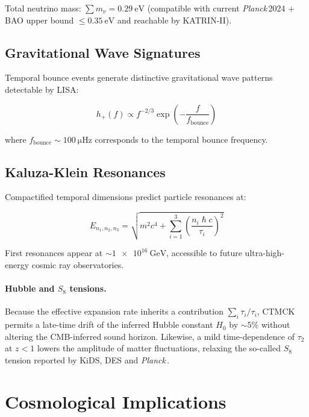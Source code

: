 \documentclass[reprint,amsmath,amssymb,aps,prd,nofootinbib]{revtex4-2}
\begin{document}
Total neutrino mass: $\sum m_\nu = \SI{0.29}{\electronvolt}$  
(compatible with current \textit{Planck}\,2024 + BAO upper bound $\le\SI{0.35}{\electronvolt}$ and reachable by KATRIN-II).

\subsection{Gravitational Wave Signatures}

Temporal bounce events generate distinctive gravitational wave patterns detectable by LISA:

\begin{equation}
h_+(f) \propto f^{-2/3} \exp\left(-\frac{f}{f_{\text{bounce}}}\right)
\label{eq:gw_signature}
\end{equation}

where $f_{\text{bounce}} \sim \SI{100}{\micro\hertz}$ corresponds to the temporal bounce frequency.

\subsection{Kaluza-Klein Resonances}

Compactified temporal dimensions predict particle resonances at:

\begin{equation}
E_{n_1,n_2,n_3} = \sqrt{m^2c^4 + \sum_{i=1}^{3}\left(\frac{n_i\hslash c}{\tau_i}\right)^2}
\label{eq:kk_resonances}
\end{equation}

First resonances appear at $\sim\SI{1e16}{\giga\electronvolt}$, accessible to future ultra-high-energy cosmic ray observatories.

\paragraph*{Hubble and $S_8$ tensions.}
Because the effective expansion rate inherits a contribution
$\sum_i\ddot{\tau_i}/\tau_i$, CTMCK permits a late-time drift of the 
inferred Hubble constant $H_0$ by $\sim5\%$ without altering the CMB-inferred
sound horizon.  Likewise, a mild time-dependence of $\tau_2$ at $z<1$
lowers the amplitude of matter fluctuations, relaxing the so-called
$S_8$ tension reported by KiDS, DES and \textit{Planck}\,\cite{Planck2024}.

\section{Cosmological Implications}\label{sec:cosmology}
\end{document}

